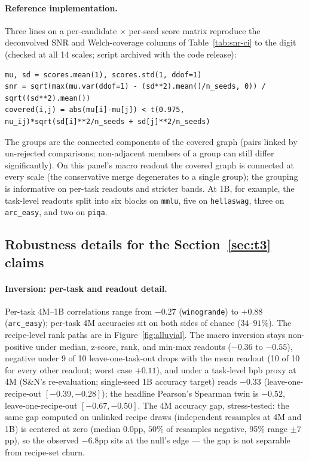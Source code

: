 \paragraph{Reference implementation.} Three lines on a per-candidate $\times$ per-seed score
matrix reproduce the deconvolved SNR and Welch-coverage columns of Table~\ref{tab:snr-ci} to the
digit (checked at all 14 scales; script archived with the code release):
\begin{verbatim}
mu, sd = scores.mean(1), scores.std(1, ddof=1)
snr = sqrt(max(mu.var(ddof=1) - (sd**2).mean()/n_seeds, 0)) / sqrt((sd**2).mean())
covered(i,j) = abs(mu[i]-mu[j]) < t(0.975, nu_ij)*sqrt(sd[i]**2/n_seeds + sd[j]**2/n_seeds)
\end{verbatim}
The groups are the connected components of the covered graph (pairs linked by un-rejected comparisons; non-adjacent members of a group can still differ significantly). On this panel's
macro readout the covered graph is connected at every scale (the conservative merge degenerates
to a single group); the grouping is informative on per-task readouts and stricter bands. At 1B,
for example, the task-level readouts split into six blocks on \texttt{mmlu}, five on
\texttt{hellaswag}, three on \texttt{arc\_easy}, and two on \texttt{piqa}.

\subsection{Robustness details for the Section~\ref{sec:t3} claims}
\label{app:t3-robust}

\paragraph{Inversion: per-task and readout detail.}
Per-task 4M--1B correlations range from $-0.27$ (\texttt{winogrande}) to $+0.88$
(\texttt{arc\_easy}); per-task 4M accuracies sit on both sides of chance ($34$--$91\%$).
The recipe-level rank paths are in Figure~\ref{fig:alluvial}. The macro inversion stays non-positive under median, z-score, rank, and min-max readouts
($-0.36$ to $-0.55$), negative under 9 of 10 leave-one-task-out drops with the mean readout
(10 of 10 for every other readout; worst case $+0.11$), and under a task-level bpb proxy at
4M (S\&N's re-evaluation; single-seed 1B accuracy target) reads $-0.33$ (leave-one-recipe-out $[-0.39, -0.28]$);
the headline Pearson's Spearman twin is $-0.52$, leave-one-recipe-out $[-0.67, -0.50]$.
The 4M accuracy gap, stress-tested: the same gap computed on unlinked recipe draws
(independent resamples at 4M and 1B) is centered at zero (median $0.0$pp, $50\%$ of resamples
negative, 95\% range $\pm 7$pp), so the observed $-6.8$pp sits at the null's edge --- the gap
is not separable from recipe-set churn.

